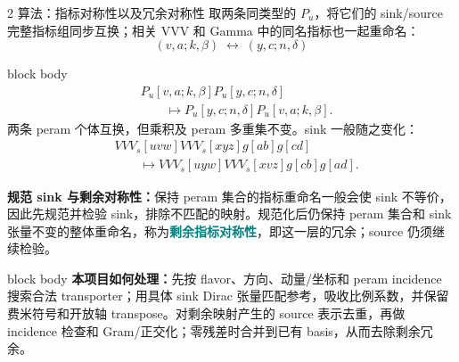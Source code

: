 \documentclass[aspectratio=169,UTF8,fontset=fandol]{ctexbeamer}
\newcommand{\kw}[1]{\textcolor{Teal}{\textbf{#1}}}
\begin{document}
\begin{frame}{2 算法：指标对称性以及冗余对称性}
\scriptsize
取两条同类型的 \(P_u\)，将它们的 sink/source 完整指标组同步互换；相关 VVV 和 Gamma 中的同名指标也一起重命名：
\[
\boxed{(v,a;k,\beta)\;\longleftrightarrow\;(y,c;n,\delta)}
\]
\begin{beamercolorbox}[sep=0.35em,wd=\linewidth]{block body}
\[
\begin{aligned}
&P_u[v,a;k,\beta]P_u[y,c;n,\delta]\\[-0.15em]
&\qquad\longmapsto P_u[y,c;n,\delta]P_u[v,a;k,\beta].
\end{aligned}
\]
两条 peram 个体互换，但乘积及 peram 多重集不变。sink 一般随之变化：
\[
\begin{aligned}
&VVV_s[uvw]VVV_s[xyz]g[ab]g[cd]\\[-0.15em]
&\qquad\longmapsto VVV_s[uyw]VVV_s[xvz]g[cb]g[ad].
\end{aligned}
\]
\end{beamercolorbox}
\vspace{0.25em}
\textbf{规范 sink 与剩余对称性：}保持 peram 集合的指标重命名一般会使 sink 不等价，因此先规范并检验 sink，排除不匹配的映射。规范化后仍保持 peram 集合和 sink 张量不变的整体重命名，称为\kw{剩余指标对称性}，即这一层的冗余；source 仍须继续检验。
\vspace{0.3em}
\begin{beamercolorbox}[sep=0.4em,wd=\linewidth]{block body}
\textbf{本项目如何处理：}先按 flavor、方向、动量/坐标和 peram incidence 搜索合法 transporter；用具体 sink Dirac 张量匹配参考，吸收比例系数，并保留费米符号和开放轴 transpose。对剩余映射产生的 source 表示去重，再做 incidence 检查和 Gram/正交化；零残差时合并到已有 basis，从而去除剩余冗余。
\end{beamercolorbox}
\end{frame}
\end{document}
